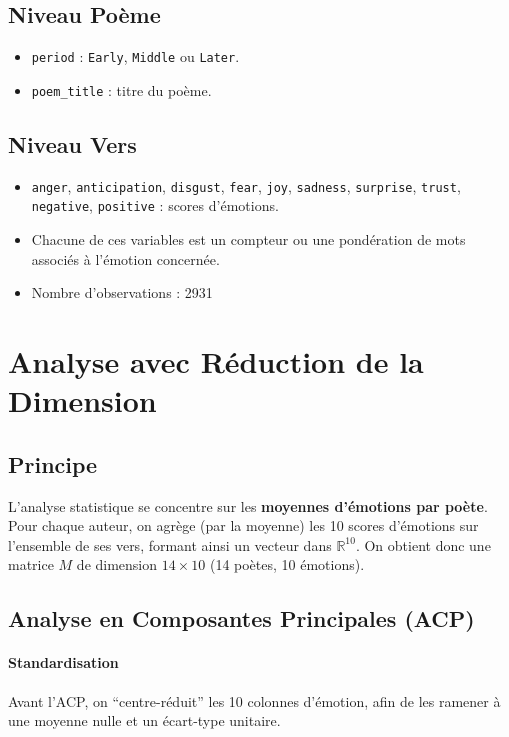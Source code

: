 \documentclass[12pt,a4paper]{article}
\begin{document}
	\subsection{Niveau Poème}
	\begin{itemize}
		\item \texttt{period} : \texttt{Early}, \texttt{Middle} ou \texttt{Later}.
		\item \texttt{poem\_title} : titre du poème.
	\end{itemize}
	
	\subsection{Niveau Vers}
	\begin{itemize}
		\item \texttt{anger}, \texttt{anticipation}, \texttt{disgust}, \texttt{fear}, 
		\texttt{joy}, \texttt{sadness}, \texttt{surprise}, \texttt{trust}, 
		\texttt{negative}, \texttt{positive} : scores d’émotions.
		\item Chacune de ces variables est un compteur ou une pondération de mots 
		associés à l’émotion concernée.
		\item Nombre d'observations : 2931
	\end{itemize}
	

	
	\section{Analyse avec Réduction de la Dimension}
	
	\subsection{Principe}
	L’analyse statistique se concentre sur les \textbf{moyennes d’émotions par poète}. 
	Pour chaque auteur, on agrège (par la moyenne) les 10 scores d’émotions 
	sur l’ensemble de ses vers, formant ainsi un vecteur dans $\mathbb{R}^{10}$. 
	On obtient donc une matrice $M$ de dimension $14 \times 10$ (14 poètes, 10 émotions).
	
	\subsection{Analyse en Composantes Principales (ACP)}
	\paragraph{Standardisation}
	Avant l’ACP, on ``centre-réduit'' les 10 colonnes d’émotion, 
	afin de les ramener à une moyenne nulle et un écart-type unitaire.
	
\end{document}
